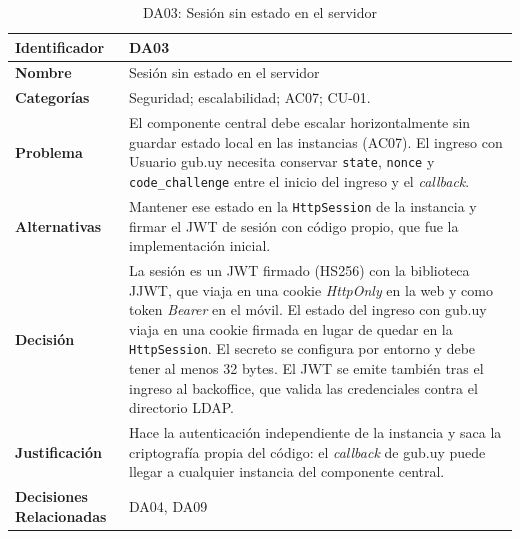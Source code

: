 \begin{table}[H]
    \small
    \centering
    \caption{DA03: Sesión sin estado en el servidor}
    \label{tab:da03}
    \begin{tabular}{|p{4.1cm}|p{11.7cm}|}
        \hline
            \textbf{Identificador} & DA03 \\
        \hline
            \textbf{Nombre} & Sesión sin estado en el servidor \\
        \hline
            \textbf{Categorías} & Seguridad; escalabilidad; AC07; CU-01. \\
        \hline
            \textbf{Problema} & El componente central debe escalar horizontalmente sin guardar estado local en las instancias (AC07). El ingreso con Usuario gub.uy necesita conservar \texttt{state}, \texttt{nonce} y \texttt{code\_challenge} entre el inicio del ingreso y el \textit{callback}. \\
        \hline
            \textbf{Alternativas} & Mantener ese estado en la \texttt{HttpSession} de la instancia y firmar el JWT de sesión con código propio, que fue la implementación inicial. \\
        \hline
            \textbf{Decisión} & La sesión es un JWT firmado (HS256) con la biblioteca JJWT, que viaja en una cookie \textit{HttpOnly} en la web y como token \textit{Bearer} en el móvil. El estado del ingreso con gub.uy viaja en una cookie firmada en lugar de quedar en la \texttt{HttpSession}. El secreto se configura por entorno y debe tener al menos 32 bytes. El JWT se emite también tras el ingreso al backoffice, que valida las credenciales contra el directorio LDAP. \\
        \hline
            \textbf{Justificación} & Hace la autenticación independiente de la instancia y saca la criptografía propia del código: el \textit{callback} de gub.uy puede llegar a cualquier instancia del componente central. \\
        \hline
            \textbf{Decisiones Relacionadas} & DA04, DA09 \\
        \hline
    \end{tabular}
\end{table}

